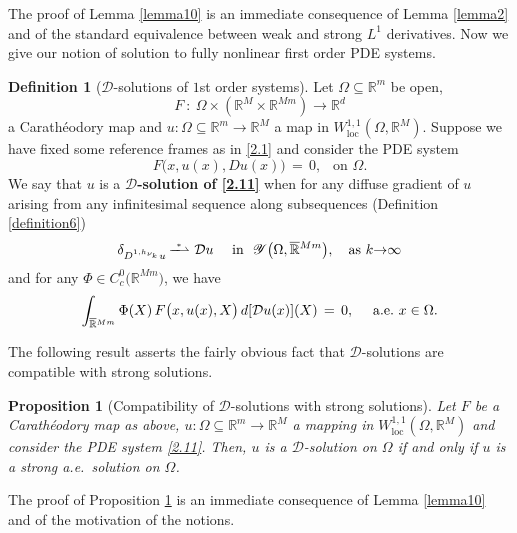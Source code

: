 \documentclass{amsart}
\newtheorem{proposition}[theorem]{Proposition}
\theoremstyle{definition}
\newtheorem{definition}[theorem]{Definition}
\numberwithin{equation}{section}
\begin{document}
The proof of Lemma \ref{lemma10} is an immediate consequence of Lemma \ref{lemma2} and of the standard equivalence between weak and strong $L^1$ derivatives. Now we give our notion of solution to fully nonlinear first order PDE systems.

\begin{definition}[${\mathcal{D}}$-solutions of $1$st order systems] \label{definition11} Let ${\Omega}{\subseteq} {\mathbb{R}}^m$ be open,
\[
F\ : \ {\Omega} {\times} \left({\mathbb{R}}^M{\times} {\mathbb{R}}^{Mm} \right) {\longrightarrow} {\mathbb{R}}^d
\]
a Carath\'eodory map and $u : {\Omega}{\subseteq} {\mathbb{R}}^m {\longrightarrow} {\mathbb{R}}^M$ a map in $W^{1,1}_{\text{loc}}({\Omega},{\mathbb{R}}^M)$. Suppose we have fixed some reference frames as in \eqref{2.1} and consider the PDE system
\begin{equation} \label{2.11}
F\big(x,u(x),Du(x)\big)\, =\,0, \ \ \text{ on }{\Omega}.
\end{equation}
We say that $u$ is a \textbf{${\mathcal{D}}$-solution of \eqref{2.11}} when for any diffuse gradient of $u$ arising from any infinitesimal sequence along subsequences (Definition \ref{definition6})
 \[
 {\delta}_{D^{1,h_{\nu_k}}u} \, \overset{^*}{\smash{-\!\!\!\!-\!\!\!\!\rightharpoonup}}\, \, {\mathcal{D}} u \ \ \ \text{ in }\ \mathscr{Y}\big({\Omega}, \smash{\overline{\mathbb{R}}}^{Mm} \big),\ \ \text{ as }k{\rightarrow} \infty
\]
and for any $\Phi \in C^0_c\big( {\mathbb{R}}^{Mm}\big)$, we have
\[
\int_{\smash{\overline{\mathbb{R}}}^{Mm}} \Phi(X)\, F\big(x,u(x),X\big)\, d[{\mathcal{D}} u(x) ](X)\, =\, 0, \ \ \ \text{ a.e.\ }x\in {\Omega}.
\] 
 \end{definition} 

The following result asserts the fairly obvious fact that ${\mathcal{D}}$-solutions are compatible with strong solutions. 

\begin{proposition}[Compatibility of ${\mathcal{D}}$-solutions with strong solutions] \label{proposition14} Let $F$ be a Carath\'eodory map as above, $u:{\Omega}{\subseteq} {\mathbb{R}}^m {\longrightarrow} {\mathbb{R}}^M$ a mapping in $W^{1,1}_{\text{loc}}({\Omega},{\mathbb{R}}^M)$ and consider the PDE system \eqref{2.11}. Then, $u $ is a ${\mathcal{D}}$-solution on ${\Omega}$ if and only if $u$ is a strong a.e.\ solution on ${\Omega}$.
\end{proposition}

The proof of Proposition \ref{proposition14}  is an immediate consequence of Lemma \ref{lemma10} and of the motivation of the notions.
\end{document}
